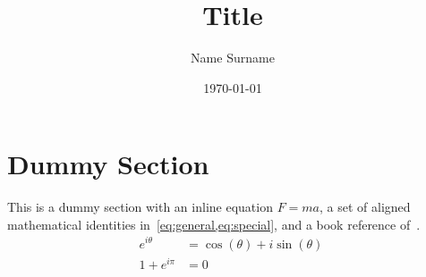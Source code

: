 \documentclass[a4paper,11pt]{article}
\title{Title}
\author{Name Surname}
\date{\today}
\newcommand{\IM}{i} %
\newcommand{\EXP}[1]{e^{#1}} %
\begin{document}
\maketitle

\section{Dummy Section}
This is a dummy section with an inline equation \(F = ma\), a set of
aligned mathematical identities in~\cref{eq:general,eq:special}, and
a book reference of~\autocite{knuth1997art}.
\begin{align}
	\EXP{\IM\theta}  & = \cos(\theta)+\IM\sin(\theta)~\label{eq:general} \\
	1 + \EXP{\IM\pi} & = 0~\label{eq:special}
\end{align}

\printbibliography{}
\end{document}
